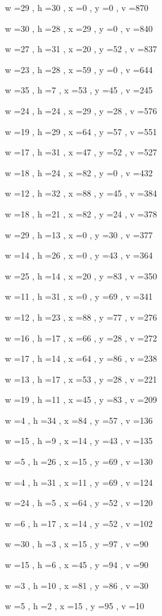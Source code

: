 \documentclass[11pt]{article}
\begin{document}
w =29 , h =30 , x =0 , y =0 , v =870
\par
w =30 , h =28 , x =29 , y =0 , v =840
\par
w =27 , h =31 , x =20 , y =52 , v =837
\par
w =23 , h =28 , x =59 , y =0 , v =644
\par
w =35 , h =7 , x =53 , y =45 , v =245
\par
w =24 , h =24 , x =29 , y =28 , v =576
\par
w =19 , h =29 , x =64 , y =57 , v =551
\par
w =17 , h =31 , x =47 , y =52 , v =527
\par
w =18 , h =24 , x =82 , y =0 , v =432
\par
w =12 , h =32 , x =88 , y =45 , v =384
\par
w =18 , h =21 , x =82 , y =24 , v =378
\par
w =29 , h =13 , x =0 , y =30 , v =377
\par
w =14 , h =26 , x =0 , y =43 , v =364
\par
w =25 , h =14 , x =20 , y =83 , v =350
\par
w =11 , h =31 , x =0 , y =69 , v =341
\par
w =12 , h =23 , x =88 , y =77 , v =276
\par
w =16 , h =17 , x =66 , y =28 , v =272
\par
w =17 , h =14 , x =64 , y =86 , v =238
\par
w =13 , h =17 , x =53 , y =28 , v =221
\par
w =19 , h =11 , x =45 , y =83 , v =209
\par
w =4 , h =34 , x =84 , y =57 , v =136
\par
w =15 , h =9 , x =14 , y =43 , v =135
\par
w =5 , h =26 , x =15 , y =69 , v =130
\par
w =4 , h =31 , x =11 , y =69 , v =124
\par
w =24 , h =5 , x =64 , y =52 , v =120
\par
w =6 , h =17 , x =14 , y =52 , v =102
\par
w =30 , h =3 , x =15 , y =97 , v =90
\par
w =15 , h =6 , x =45 , y =94 , v =90
\par
w =3 , h =10 , x =81 , y =86 , v =30
\par
w =5 , h =2 , x =15 , y =95 , v =10
\par
\newpage
\end{document}
